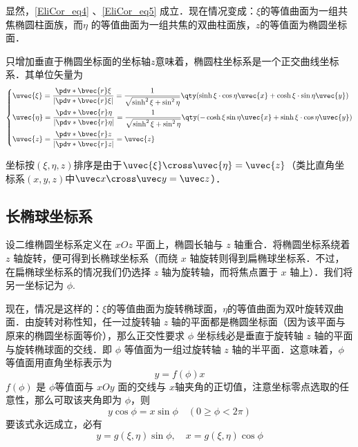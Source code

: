 显然，\autoref{EliCor_eq4} 、\autoref{EliCor_eq5} 成立．现在情况变成：$\xi$的等值曲面为一组共焦椭圆柱面族，而$\eta$ 的等值曲面为一组共焦的双曲柱面族，$z$的等值面为椭圆坐标面．

只增加垂直于椭圆坐标面的坐标轴$z$意味着，椭圆柱坐标系是一个正交曲线坐标系．其单位矢量为
\begin{equation}
\left\{
    \begin{aligned}
    &\uvec{\xi}=\frac{\pdv*{\bvec{r}}{\xi}}{|\pdv*{\bvec{r}}{\xi}|}=\frac{1}{\sqrt{\sinh^2\xi+\sin^2\eta}}\qty(\sinh\xi\cdot\cos\eta\uvec{x}+\cosh\xi\cdot\sin\eta\uvec{y})\\
    &\uvec{\eta }=\frac{\pdv*{\bvec{r}}{\eta}}{|\pdv*{\bvec{r}}{\eta}|}=\frac{1}{\sqrt{\sinh^2\xi+\sin^2\eta}}\qty(-\cosh\xi\sin\eta\uvec{x}+\sinh\xi\cdot\cos\eta\uvec{y})\\
    &\uvec{z}=\frac{\pdv*{\bvec{r}}{z}}{|\pdv*{\bvec{r}}{z}|}=\uvec{z}
    \end{aligned}\right.
\end{equation}

坐标按$(\xi,\eta,z)$排序是由于$\uvec{\xi}\cross\uvec{\eta}=\uvec{z}$（类比直角坐标系$(x,y,z)$中$\uvec x\cross\uvec y=\uvec z$）．
\subsection{长椭球坐标系}
设二维椭圆坐标系定义在 $xOz$ 平面上，椭圆长轴与 $z$ 轴重合．将椭圆坐标系绕着 $z$ 轴旋转，便可得到长椭球坐标系（而绕 $x$ 轴旋转则得到扁椭球坐标系．不过，在扁椭球坐标系的情况我们仍选择 $z$ 轴为旋转轴，而将焦点置于 $x$ 轴上）．我们将另一坐标记为 $\phi$.

现在，情况是这样的：$\xi$的等值曲面为旋转椭球面，$\eta$的等值曲面为双叶旋转双曲面．由旋转对称性知，任一过旋转轴 $z$ 轴的平面都是椭圆坐标面（因为该平面与原来的椭圆坐标面等价），那么正交性要求 $\phi$ 坐标线必是垂直于旋转轴 $z$ 轴的平面与旋转椭球面的交线．即 $\phi$ 等值面为一组过旋转轴 $z$ 轴的半平面．这意味着，$\phi$ 等值面用直角坐标表示为
\begin{equation}
y=f(\phi)x
\end{equation}
$f(\phi)$ 是 $\phi$等值面与 $xOy$ 面的交线与 $x$轴夹角的正切值，注意坐标零点选取的任意性，那么可取该夹角即为 $\phi$，则
\begin{equation}
y\cos\phi=x\sin\phi\quad(0\geq\phi<2\pi)
\end{equation}
要该式永远成立，必有
\begin{equation}\label{EliCor_eq2}
y=g(\xi,\eta)\sin\phi,\quad
x=g(\xi,\eta)\cos\phi
\end{equation}

